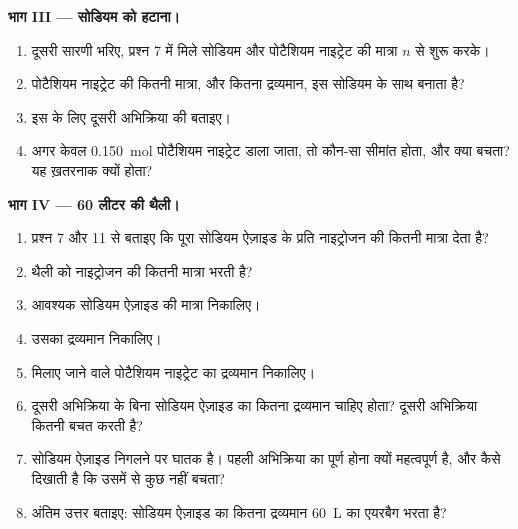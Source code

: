 \begin{problem}
\medskip
\noindent\textbf{भाग III --- सोडियम को हटाना।}
\begin{enumerate}[resume]
  \item दूसरी  सारणी भरिए, प्रश्न 7 में मिले सोडियम
        और पोटैशियम नाइट्रेट की मात्रा $n$ से
        शुरू करके।
  \item पोटैशियम नाइट्रेट की कितनी मात्रा, और कितना द्रव्यमान, इस सोडियम के साथ
         बनाता है?
  \item इस  के लिए दूसरी अभिक्रिया की  बताइए।
  \item अगर केवल \qty{0.150}{mol} पोटैशियम नाइट्रेट डाला जाता, तो कौन-सा
         सीमांत होता, और क्या बचता? यह ख़तरनाक क्यों
        होता?
\end{enumerate}

\medskip
\noindent\textbf{भाग IV --- 60 लीटर की थैली।}
\begin{enumerate}[resume]
  \item प्रश्न 7 और 11 से बताइए कि पूरा  सोडियम ऐज़ाइड के प्रति 
        नाइट्रोजन की कितनी मात्रा देता है?
  \item थैली को नाइट्रोजन की कितनी मात्रा भरती है?
  \item आवश्यक सोडियम ऐज़ाइड की मात्रा निकालिए।
  \item उसका द्रव्यमान निकालिए।
  \item मिलाए जाने वाले पोटैशियम नाइट्रेट का द्रव्यमान निकालिए।
  \item दूसरी अभिक्रिया के बिना सोडियम ऐज़ाइड का कितना द्रव्यमान चाहिए
        होता? दूसरी अभिक्रिया कितनी बचत करती है?
  \item सोडियम ऐज़ाइड निगलने पर घातक है। पहली अभिक्रिया का पूर्ण होना
        क्यों महत्वपूर्ण है, और  कैसे दिखाती है कि उसमें से कुछ
        नहीं बचता?
  \item अंतिम उत्तर बताइए: सोडियम ऐज़ाइड का कितना द्रव्यमान
        \qty{60}{L} का एयरबैग भरता है?
\end{enumerate}
\end{problem}
